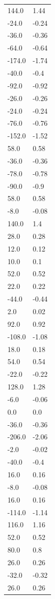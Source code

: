 \begin{longtable}{ll}
144.0 & 1.44 \\
-24.0 & -0.24 \\
-36.0 & -0.36 \\
-64.0 & -0.64 \\
-174.0 & -1.74 \\
-40.0 & -0.4 \\
-92.0 & -0.92 \\
-26.0 & -0.26 \\
-24.0 & -0.24 \\
-76.0 & -0.76 \\
-152.0 & -1.52 \\
58.0 & 0.58 \\
-36.0 & -0.36 \\
-78.0 & -0.78 \\
-90.0 & -0.9 \\
58.0 & 0.58 \\
-8.0 & -0.08 \\
140.0 & 1.4 \\
28.0 & 0.28 \\
12.0 & 0.12 \\
10.0 & 0.1 \\
52.0 & 0.52 \\
22.0 & 0.22 \\
-44.0 & -0.44 \\
2.0 & 0.02 \\
92.0 & 0.92 \\
-108.0 & -1.08 \\
18.0 & 0.18 \\
54.0 & 0.54 \\
-22.0 & -0.22 \\
128.0 & 1.28 \\
-6.0 & -0.06 \\
0.0 & 0.0 \\
-36.0 & -0.36 \\
-206.0 & -2.06 \\
-2.0 & -0.02 \\
-40.0 & -0.4 \\
16.0 & 0.16 \\
-8.0 & -0.08 \\
16.0 & 0.16 \\
-114.0 & -1.14 \\
116.0 & 1.16 \\
52.0 & 0.52 \\
80.0 & 0.8 \\
26.0 & 0.26 \\
-32.0 & -0.32 \\
26.0 & 0.26 \\

\end{longtable}
